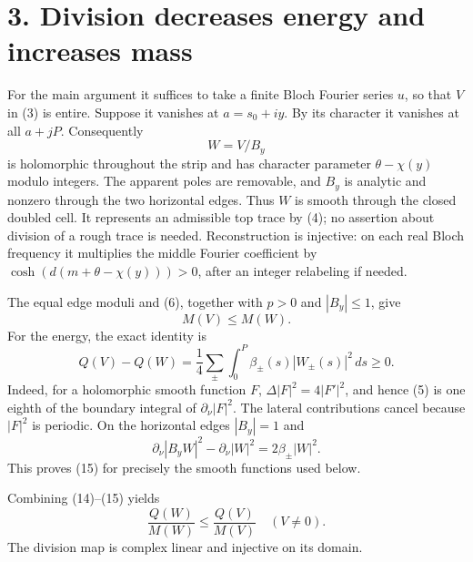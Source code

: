 \documentclass[11pt]{article}
\begin{document}
\section*{3. Division decreases energy and increases mass}
For the main argument it suffices to take a finite Bloch Fourier
series $u$, so that $V$ in (3) is entire. Suppose it vanishes at
$a=s_0+iy$. By its character it vanishes at all $a+jP$. Consequently
\[
 W=V/B_y \tag{13}
\]
is holomorphic throughout the strip and has character parameter
$\theta-\chi(y)$ modulo integers. The apparent poles are removable,
and $B_y$ is analytic and nonzero through the two horizontal edges.
Thus $W$ is smooth through the closed doubled cell. It represents
an admissible top trace by (4); no assertion about division of a
rough trace is needed. Reconstruction is injective: on each real
Bloch frequency it multiplies the middle Fourier coefficient by
$\cosh(d(m+\theta-\chi(y)))>0$, after an integer relabeling if needed.

The equal edge moduli and (6), together with $p>0$ and $|B_y|\le1$,
give
\[
 M(V)\le M(W). \tag{14}
\]
For the energy, the exact identity is
\[
 Q(V)-Q(W)
 =\frac14\sum_{\pm}\int_0^P\beta_\pm(s)|W_\pm(s)|^2\,ds\ge0.
 \tag{15}
\]
Indeed, for a holomorphic smooth function $F$,
$\Delta|F|^2=4|F'|^2$, and hence (5) is one eighth of the boundary
integral of $\partial_\nu|F|^2$. The lateral contributions cancel
because $|F|^2$ is periodic. On the horizontal edges $|B_y|=1$ and
\[
 \partial_\nu|B_yW|^2-\partial_\nu|W|^2
 =2\beta_\pm|W|^2.
\]
This proves (15) for precisely the smooth functions used below.

Combining (14)--(15) yields
\[
 \frac{Q(W)}{M(W)}\le\frac{Q(V)}{M(V)}
 \quad(V\ne0). \tag{16}
\]
The division map is complex linear and injective on its domain.
\end{document}
